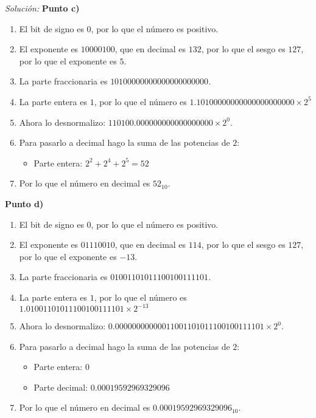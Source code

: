 \documentclass{article}
\newenvironment{solution}
    {\textit{Solución:}}
    {}
\begin{document}
\begin{solution}
\textbf{Punto c)}
\begin{enumerate}
    \item El bit de signo es $0$, por lo que el número es positivo.
    \item El exponente es $10000100$, que en decimal es $132$, por lo que el sesgo es $127$, por lo que el exponente es $5$.
    \item La parte fraccionaria es $10100000000000000000000$.
    \item La parte entera es $1$, por lo que el número es $1.10100000000000000000000 \times 2^{5}$
    \item Ahora lo desnormalizo: $110100.000000000000000000 \times 2^{0}$.
    \item Para pasarlo a decimal hago la suma de las potencias de $2$:
    \begin{itemize}
        \item Parte entera: $2^2+2^4+2^5 = 52$ 
    \end{itemize}
    \item Por lo que el número en decimal es $52_{10}$.
\end{enumerate}

\textbf{Punto d)}
\begin{enumerate}
    \item El bit de signo es $0$, por lo que el número es positivo.
    \item El exponente es $01110010$, que en decimal es $114$, por lo que el sesgo es $127$, por lo que el exponente es $-13$.
    \item La parte fraccionaria es $01001101011100100111101$.
    \item La parte entera es $1$, por lo que el número es $1.01001101011100100111101 \times 2^{-13}$
    \item Ahora lo desnormalizo: $0.00000000000011001101011100100111101 \times 2^{0}$.
    \item Para pasarlo a decimal hago la suma de las potencias de $2$:
    \begin{itemize}
        \item Parte entera: $0$ 
        \item Parte decimal: $0.00019592969329096$
    \end{itemize}
    \item Por lo que el número en decimal es $0.00019592969329096_{10}$.
\end{enumerate}


\end{solution}
\end{document}
